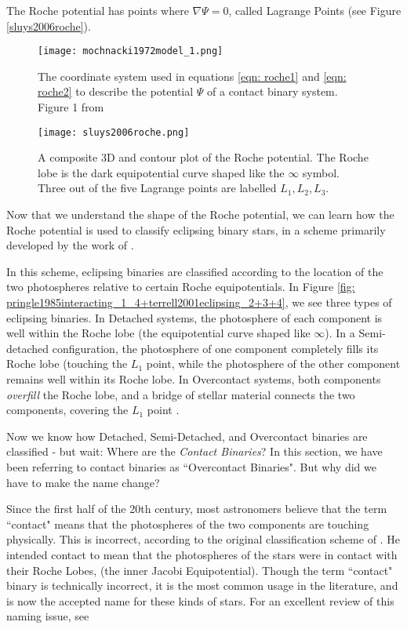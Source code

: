 \documentclass[12pt]{article} %
\numberwithin{equation}{section} %
\begin{document}
The Roche potential has points where $\nabla \Psi = 0$, called Lagrange Points (see Figure \ref{sluys2006roche}). 

\begin{figure}[H]
\centering
\texttt{[image: mochnacki1972model\_1.png]}
\caption{The coordinate system used in equations \ref{eqn: roche1} and \ref{eqn: roche2} to describe the potential $\Psi$ of a contact binary system. Figure 1 from \citet{mochnacki1972model}}
\label{fig: mochnacki1972model_1}
\end{figure}

\begin{figure}[H]
\centering
\texttt{[image: sluys2006roche.png]}
\caption{A composite 3D and contour plot of the Roche potential. The Roche lobe is the dark equipotential curve shaped like the $\infty$ symbol. Three out of the five Lagrange points are labelled $L_{1}, L_{2}, L_{3}$.  \citep{sluys2006roche}}
\label{fig: sluys2006roche}
\end{figure}

Now that we understand the shape of the Roche potential, we can learn how the Roche potential is used to classify eclipsing binary stars, in a scheme primarily developed by the work of \citet{kopal1959close}.

In this scheme, eclipsing binaries are classified according to the location of the two photospheres relative to certain Roche equipotentials. In Figure \ref{fig: pringle1985interacting_1_4+terrell2001eclipsing_2+3+4}, we see three types of eclipsing binaries. In Detached systems, the photosphere of each component is well within the Roche lobe (the equipotential curve shaped like $\infty$). In a Semi-detached configuration, the photosphere of one component completely fills its Roche lobe (touching the $L_{1}$ point, while the photosphere of the other component remains well within its Roche lobe. In Overcontact systems, both components \emph{overfill} the Roche lobe, and a bridge of stellar material connects the two components, covering the $L_{1}$ point \citep{terrell2001eclipsing}.

Now we know how Detached, Semi-Detached, and Overcontact binaries are classified - but wait: Where are the \emph{Contact Binaries}? In this section, we have been referring to contact binaries as ``Overcontact Binaries". But why did we have to make the name change?

Since the first half of the 20th century, most astronomers believe that the term ``contact" means that the photospheres of the two components are touching physically. This is incorrect, according to the original classification scheme of \citet{kopal1959close}. He intended contact to mean that the photospheres of the stars were in contact with their Roche Lobes, (the inner Jacobi Equipotential). Though the term ``contact" binary is technically incorrect, it is the most common usage in the literature, and is now the accepted name for these kinds of stars. For an excellent review of this naming issue, see \citet{wilson2001binary}
\end{document}
